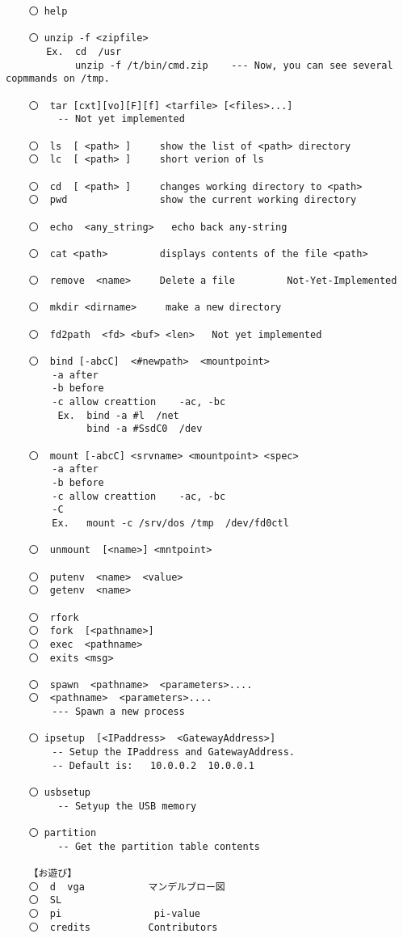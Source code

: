 \begin{verbatim}
    〇 help
    
    〇 unzip -f <zipfile>  
       Ex.  cd  /usr
            unzip -f /t/bin/cmd.zip    --- Now, you can see several copmmands on /tmp.
    
    〇  tar [cxt][vo][F][f] <tarfile> [<files>...] 
         -- Not yet implemented
    
    〇  ls  [ <path> ]     show the list of <path> directory 
    〇  lc  [ <path> ]     short verion of ls
    
    〇  cd  [ <path> ]     changes working directory to <path>
    〇  pwd                show the current working directory
    
    〇  echo  <any_string>   echo back any-string 
    
    〇  cat <path>         displays contents of the file <path>
    
    〇  remove  <name>     Delete a file         Not-Yet-Implemented
    
    〇  mkdir <dirname>     make a new directory
    
    〇  fd2path  <fd> <buf> <len>   Not yet implemented
    
    〇  bind [-abcC]  <#newpath>  <mountpoint>
        -a after
        -b before
        -c allow creattion    -ac, -bc 
         Ex.  bind -a #l  /net
              bind -a #SsdC0  /dev
    
    〇  mount [-abcC] <srvname> <mountpoint> <spec>
        -a after
        -b before
        -c allow creattion    -ac, -bc 
        -C
        Ex.   mount -c /srv/dos /tmp  /dev/fd0ctl
    
    〇  unmount  [<name>] <mntpoint>  
    
    〇  putenv  <name>  <value>
    〇  getenv  <name> 
    
    〇  rfork     
    〇  fork  [<pathname>]
    〇  exec  <pathname>
    〇  exits <msg>
    
    〇  spawn  <pathname>  <parameters>....
    〇  <pathname>  <parameters>....
        --- Spawn a new process
    
    〇 ipsetup  [<IPaddress>  <GatewayAddress>]     
        -- Setup the IPaddress and GatewayAddress.
        -- Default is:   10.0.0.2  10.0.0.1
    
    〇 usbsetup
         -- Setyup the USB memory 
    
    〇 partition
         -- Get the partition table contents
    
    【お遊び】
    〇  d  vga           マンデルブロー図
    〇  SL
    〇  pi                pi-value
    〇  credits          Contributors 
\end{verbatim}   



